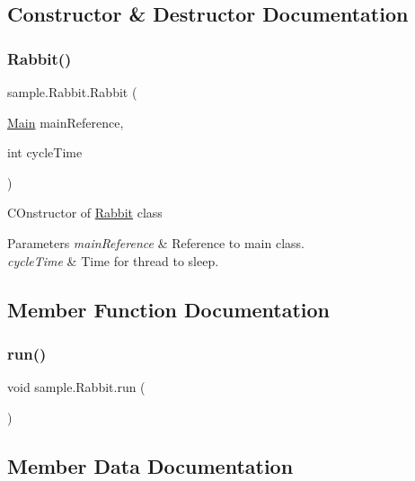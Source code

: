 \subsection{Constructor \& Destructor Documentation}
\mbox{\label{classsample_1_1_rabbit_a58fe416b0776f6dfcca2f887bb910fe7}} 
\subsubsection{\texorpdfstring{Rabbit()}{Rabbit()}}
{\footnotesize\ttfamily sample.\+Rabbit.\+Rabbit (\begin{DoxyParamCaption}\item[{\hyperlink{classsample_1_1_main}{Main}}]{main\+Reference,  }\item[{int}]{cycle\+Time }\end{DoxyParamCaption})}

C\+Onstructor of \hyperlink{classsample_1_1_rabbit}{Rabbit} class 
\begin{DoxyParams}{Parameters}
{\em main\+Reference} & Reference to main class. \\
\hline
{\em cycle\+Time} & Time for thread to sleep. \\
\hline
\end{DoxyParams}


\subsection{Member Function Documentation}
\mbox{\label{classsample_1_1_rabbit_a517b66c50187ce9ba430c9aea1b3be40}} 
\subsubsection{\texorpdfstring{run()}{run()}}
{\footnotesize\ttfamily void sample.\+Rabbit.\+run (\begin{DoxyParamCaption}{ }\end{DoxyParamCaption})}



\subsection{Member Data Documentation}
\mbox{\label{classsample_1_1_rabbit_a4ad80bc5cede7a56637f547de111e456}} 
